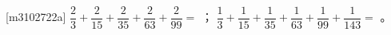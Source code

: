 [m3102722a]\quad
$\dfrac{2}{3}+\dfrac{2}{15}+\dfrac{2}{35}+\dfrac{2}{63}+\dfrac{2}{99}=$
；
$\dfrac{1}{3}+\dfrac{1}{15}+\dfrac{1}{35}+\dfrac{1}{63}+\dfrac{1}{99}+
\dfrac{1}{143}=$
。
\par